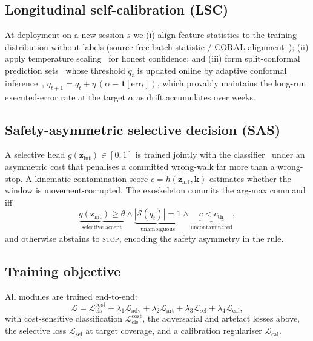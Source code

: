 \documentclass[conference]{IEEEtran}
\begin{document}
\subsection{Longitudinal self-calibration (LSC)}
At deployment on a new session $s$ we (i) align feature statistics to the training
distribution without labels (source-free batch-statistic / CORAL
alignment~\cite{sun2016}); (ii) apply temperature scaling~\cite{guo2017} for honest
confidence; and (iii) form split-conformal prediction sets~\cite{angelopoulos2023}
whose threshold $q_t$ is updated online by adaptive conformal
inference~\cite{gibbs2021},
$q_{t+1}=q_t+\eta\,(\alpha-\mathbf{1}[\text{err}_t])$,
which provably maintains the long-run executed-error rate at the target $\alpha$ as
drift accumulates over weeks.

\subsection{Safety-asymmetric selective decision (SAS)}
A selective head $g(\mathbf{z}_{\mathrm{int}})\in[0,1]$ is trained jointly with the
classifier~\cite{geifman2019} under an asymmetric cost that penalises a committed
wrong-walk far more than a wrong-stop. A kinematic-contamination score
$c=h(\mathbf{z}_{\mathrm{art}},\mathbf{k})$ estimates whether the window is
movement-corrupted. The exoskeleton commits the arg-max command iff
\[
\underbrace{g(\mathbf{z}_{\mathrm{int}})\!\ge\!\theta}_{\text{selective accept}}\!\wedge\!
\underbrace{|\mathcal{S}(q_t)|\!=\!1}_{\text{unambiguous}}\!\wedge\!
\underbrace{c<c_{\mathrm{th}}}_{\text{uncontaminated}},
\]
and otherwise abstains to \textsc{stop}, encoding the safety asymmetry in the rule.

\subsection{Training objective}
All modules are trained end-to-end:
\begin{equation}
\mathcal{L}=\mathcal{L}_{\mathrm{cls}}^{\mathrm{cost}}
+\lambda_1\mathcal{L}_{\mathrm{adv}}
+\lambda_2\mathcal{L}_{\mathrm{art}}
+\lambda_3\mathcal{L}_{\mathrm{sel}}
+\lambda_4\mathcal{L}_{\mathrm{cal}},
\end{equation}
with cost-sensitive classification $\mathcal{L}_{\mathrm{cls}}^{\mathrm{cost}}$, the
adversarial and artefact losses above, the selective loss
$\mathcal{L}_{\mathrm{sel}}$ at target coverage, and a calibration regulariser
$\mathcal{L}_{\mathrm{cal}}$.
\end{document}
